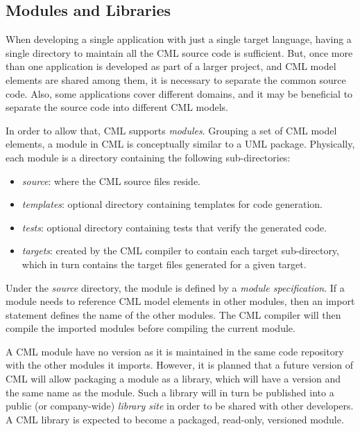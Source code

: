 \subsection{Modules and Libraries}\label{subsec:modlib}

When developing a single application with just a single target language,
having a single directory to maintain all the CML source code is sufficient.
But, once more than one application is developed as part of a larger project,
and CML model elements are shared among them,
it is necessary to separate the common source code.
Also, some applications cover different domains,
and it may be beneficial to separate the source code into different CML models.

In order to allow that, CML supports \emph{modules}.
Grouping a set of CML model elements,
a module in CML is conceptually similar to a UML \cite{uml} package.
Physically, each module is a directory containing the following sub-directories:

\begin{itemize}
\item \emph{source}: where the CML source files reside.
\item \emph{templates}: optional directory containing templates for code generation.
\item \emph{tests}: optional directory containing tests that verify the generated code.
\item \emph{targets}: created by the CML compiler to contain each target sub-directory,
which in turn contains the target files generated for a given target.
\end{itemize}

Under the \emph{source} directory, the module is defined by a \emph{module specification}.
If a module needs to reference CML model elements in other modules,
then an import statement defines the name of the other modules.
The CML compiler will then compile the imported modules
before compiling the current module.

A CML module have no version
as it is maintained in the same code repository with the other modules it imports.
However, it is planned that a future version of CML will allow packaging a module as a library,
which will have a version and the same name as the module.
Such a library will in turn be published into a public (or company-wide) \emph{library site}
in order to be shared with other developers.
A CML library is expected to become a packaged, read-only, versioned module.
